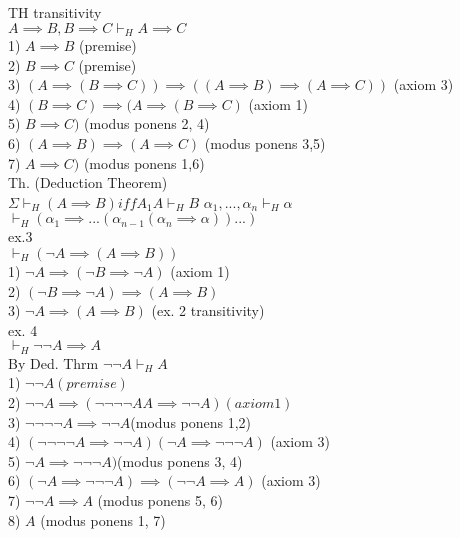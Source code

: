 \documentclass[12pt,oneside,fleqn]{article}
\theoremstyle{definition}
\begin{document}
TH transitivity \\
${ A \implies B, B \implies C} \vdash_H A \implies C$ \\
1) $A \implies B$ (premise) \\ 
2) $B \implies C$ (premise) \\
3) $( A \implies (B \implies C)) \implies (( A \implies B) \implies (A \implies C))$ (axiom 3) \\
4) $(B \implies C) \implies (A \implies (B \implies C)$ (axiom 1) \\
5) $B \implies C)$ (modus ponens 2, 4) \\
6) $(A \implies B) \implies (A \implies C)$ (modus ponens 3,5) \\
7) $A \implies C)$ (modus ponens 1,6) \\

Th. (Deduction Theorem) \\
$\Sigma \vdash_H (A \implies B) iff A_1 A \vdash_H B$
${\alpha_1,...,\alpha_n} \vdash_H \alpha $ \\
$\vdash_H (\alpha_1 \implies ...(\alpha_{n-1}(\alpha_n \implies \alpha))...)$ \\

ex.3 \\
$\vdash_H (\neg A \implies (A \implies B))$ \\
1) $\neg A \implies (\neg B \implies \neg A)$ (axiom 1) \\
2) $(\neg B \implies \neg A) \implies (A \implies B)$ \\
3) $\neg A \implies ( A \implies B)$ (ex. 2 transitivity) \\

ex. 4 \\
$\vdash_H \neg\neg A \implies A$ \\
By Ded. Thrm $\neg \neg A \vdash_H A$ \\

1) $\neg \neg A (premise)$ \\
2) $\neg \neg A \implies (\neg \neg \neg \neg A A \implies  \neg \neg A) (axiom 1)$ \\
3) $\neg \neg \neg \neg A \implies \neg \neg A $(modus ponens 1,2) \\
4) $( \neg \neg \neg \neg A \implies \neg \neg A) (\neg A \implies \neg \neg \neg A)$ (axiom 3) \\
5) $\neg A \implies \neg \neg \neg A) $(modus ponens 3, 4) \\
6) $(\neg A \implies \neg \neg \neg A) \implies ( \neg \neg A \implies A)$ (axiom 3) \\
7) $\neg \neg A \implies A$ (modus ponens 5, 6) \\
8) $A$ (modus ponens 1, 7) \\
\end{document}
